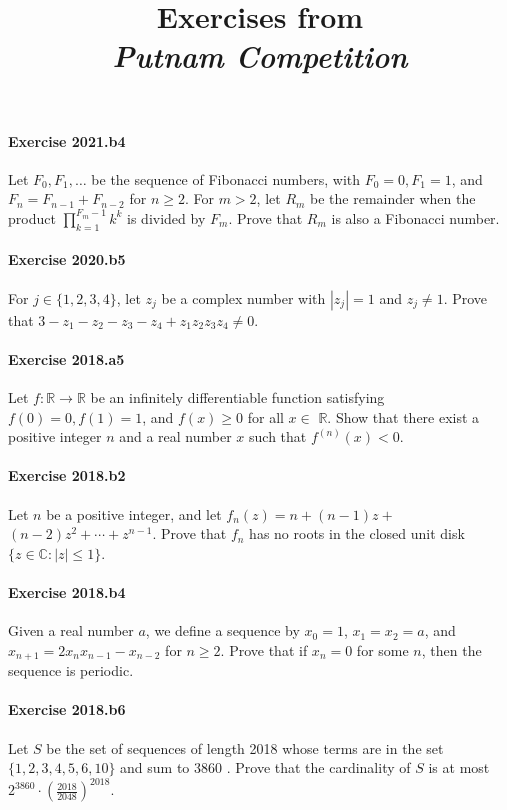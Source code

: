 \documentclass{article}
\title{\textbf{
Exercises from \\
\textit{Putnam Competition} \\
}}
\date{}
\begin{document}
\maketitle

\paragraph{Exercise 2021.b4} Let $F_{0}, F_{1}, \ldots$ be the sequence of Fibonacci numbers, with $F_{0}=0, F_{1}=1$, and $F_{n}=F_{n-1}+F_{n-2}$ for $n \geq 2$. For $m>2$, let $R_{m}$ be the remainder when the product $\prod_{k=1}^{F_{m}-1} k^{k}$ is divided by $F_{m}$. Prove that $R_{m}$ is also a Fibonacci number.

\paragraph{Exercise 2020.b5} For $j \in\{1,2,3,4\}$, let $z_{j}$ be a complex number with $\left|z_{j}\right|=1$ and $z_{j} \neq 1$. Prove that $3-z_{1}-z_{2}-z_{3}-z_{4}+z_{1} z_{2} z_{3} z_{4} \neq 0 .$

\paragraph{Exercise 2018.a5} Let $f: \mathbb{R} \rightarrow \mathbb{R}$ be an infinitely differentiable function satisfying $f(0)=0, f(1)=1$, and $f(x) \geq 0$ for all $x \in$ $\mathbb{R}$. Show that there exist a positive integer $n$ and a real number $x$ such that $f^{(n)}(x)<0$.

\paragraph{Exercise 2018.b2} Let $n$ be a positive integer, and let $f_{n}(z)=n+(n-1) z+$ $(n-2) z^{2}+\cdots+z^{n-1}$. Prove that $f_{n}$ has no roots in the closed unit disk $\{z \in \mathbb{C}:|z| \leq 1\}$.

\paragraph{Exercise 2018.b4} Given a real number $a$, we define a sequence by $x_{0}=1$, $x_{1}=x_{2}=a$, and $x_{n+1}=2 x_{n} x_{n-1}-x_{n-2}$ for $n \geq 2$. Prove that if $x_{n}=0$ for some $n$, then the sequence is periodic.

\paragraph{Exercise 2018.b6} Let $S$ be the set of sequences of length 2018 whose terms are in the set $\{1,2,3,4,5,6,10\}$ and sum to 3860 . Prove that the cardinality of $S$ is at most $2^{3860} \cdot\left(\frac{2018}{2048}\right)^{2018} .$
\end{document}
